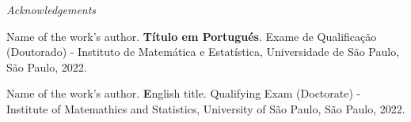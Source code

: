 \documentclass[11pt,oneside,a4paper]{book}
\newcommand{\autor}{Name of the work's author}
\newcommand{\tituloen}{English title}
\newcommand{\titulopt}{Título em Portugués}
\begin{document}
\afterpage{\blankpage}

\clearpage 
\thispagestyle{plain}
\begin{center}{\huge{\textit{Acknowledgements}} \par}\end{center}
\vspace{1em}
\lipsum[1]
\lipsum[1]
\vfil\vfil\null

\afterpage{\blankpage}
\clearpage %
 \thispagestyle{empty}
  \begin{flushleft}
    \setlength{\parskip}{0pt}
    { \par} 
    \bigskip
		\begin{center}
\noindent\begin{minipage}{0.75\textwidth}
\small{\autor. {\bfseries\titulopt}. 
Exame de Qualificação (Doutorado) - Instituto de Matemática e Estatística,
Universidade de São Paulo, São Paulo, 2022.}
\end{minipage}
\end{center}
\end{flushleft}
\bigskip


\afterpage{\blankpage}
\clearpage %
\thispagestyle{empty}
  \begin{flushleft}
    \setlength{\parskip}{0pt}
    { \par} 
    \bigskip
		\begin{center}
\noindent\begin{minipage}{0.75\textwidth}
\small{\autor. \textbf\tituloen. 
Qualifying Exam (Doctorate) - Institute of Matemathics and Statistics,
University of São Paulo, São Paulo, 2022.}
\end{minipage}
\end{center}
\end{flushleft}
\bigskip


\let\cleardoublepage\clearpage
\tableofcontents

\listoffigures %

\listoftables %
\end{document}
